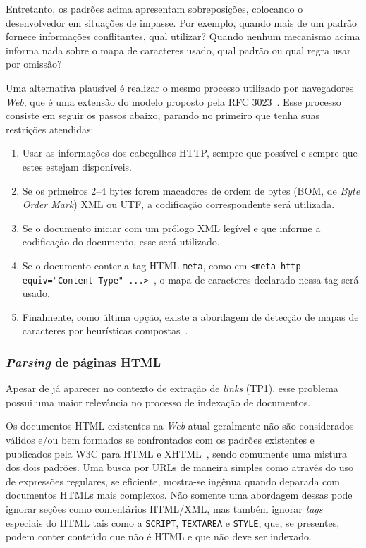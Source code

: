 \documentclass[10pt,twocolumn]{article}
\begin{document}
Entretanto, os padrões acima apresentam sobreposições, colocando o
desenvolvedor em situações de impasse. Por exemplo, quando mais de um
padrão fornece informações conflitantes, qual utilizar?  Quando nenhum
mecanismo acima informa nada sobre o mapa de caracteres usado, qual
padrão ou qual regra usar por omissão?

Uma alternativa plausível é realizar o mesmo processo utilizado por
navegadores \emph{Web}, que é uma extensão do modelo proposto pela RFC
3023~\cite{rfc3023}. Esse processo consiste em seguir os passos abaixo,
parando no primeiro que tenha suas restrições atendidas:
\begin{enumerate}
\item Usar as informações dos cabeçalhos HTTP, sempre que possível e
sempre que estes estejam disponíveis.
\item  Se os primeiros 2--4 bytes forem macadores de ordem de bytes
(BOM, de \emph{Byte Order Mark}) XML ou UTF, a codificação
correspondente será utilizada.
\item Se o documento iniciar com um prólogo XML legível e que informe a
codificação do documento, esse será utilizado.
\item Se o documento conter a tag HTML \texttt{meta}, como em \texttt{<meta
http-equiv="Content-Type" ...> }, o mapa de caracteres declarado nessa
tag será usado.
\item Finalmente, como última opção, existe a abordagem de detecção de
mapas de caracteres por heurísticas compostas~\cite{mozillaiuc}.
\end{enumerate}

\subsubsection{\emph{Parsing} de páginas HTML}\label{prob:html}

Apesar de já aparecer no contexto de extração de \emph{links} (TP1),
esse problema  possui uma maior relevância no processo de indexação
de documentos.

Os documentos HTML existentes na \emph{Web} atual geralmente não são
considerados válidos
e/ou bem formados se confrontados com os padrões existentes e publicados
pela W3C para HTML e XHTML~\cite{html4tr, bray2006xml}, sendo comumente
uma mistura dos dois padrões. Uma busca por URLs de maneira simples como
através do uso de expressões regulares, se eficiente, mostra-se ingênua
quando deparada com documentos HTMLs mais complexos. Não somente uma
abordagem dessas pode ignorar seções como comentários HTML/XML, mas
também ignorar \emph{tags} especiais do HTML tais como a \texttt{SCRIPT},
\texttt{TEXTAREA} e \texttt{STYLE}, que, se presentes, podem conter
conteúdo que não é HTML e que não deve ser indexado.
\end{document}
